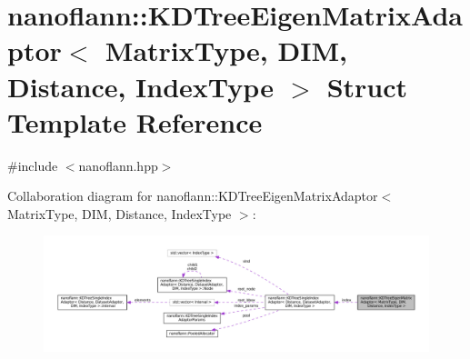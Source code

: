 \hypertarget{structnanoflann_1_1_k_d_tree_eigen_matrix_adaptor}{\section{nanoflann\-:\-:K\-D\-Tree\-Eigen\-Matrix\-Adaptor$<$ Matrix\-Type, D\-I\-M, Distance, Index\-Type $>$ Struct Template Reference}
\label{structnanoflann_1_1_k_d_tree_eigen_matrix_adaptor}
}


{\ttfamily \#include $<$nanoflann.\-hpp$>$}



Collaboration diagram for nanoflann\-:\-:K\-D\-Tree\-Eigen\-Matrix\-Adaptor$<$ Matrix\-Type, D\-I\-M, Distance, Index\-Type $>$\-:
\nopagebreak
\begin{figure}[H]
\begin{center}
\leavevmode
\includegraphics[width=350pt]{structnanoflann_1_1_k_d_tree_eigen_matrix_adaptor__coll__graph}
\end{center}
\end{figure}
